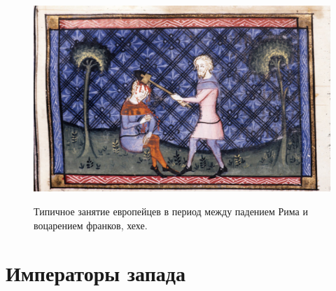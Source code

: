 \begin{figure}[h!tb]
	\centering\includegraphics[scale=0.2]{Relig_gambit/1572932526111883618.png}
	\label{fig:gambit11} %
	\caption{Типичное занятие европейцев в период между падением Рима и воцарением франков, хехе.	}
\end{figure}

\section{Императоры запада}

